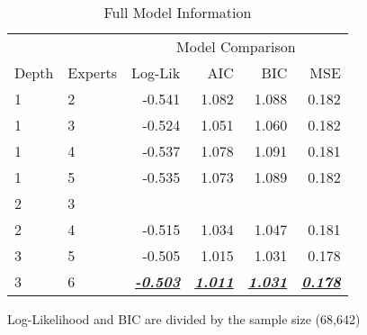 \documentclass[12pt]{article}
\newcommand{\ibu}[1]{\textbf{\underline{\textit{#1}}}}
\begin{document}
\begin{table} \centering
  \caption{Full Model Information}
  \begin{threeparttable}
    {\footnotesize
    \begin{tabular}[r]{l l r r r r}
  \cmidrule{1-6}
        &         &  \multicolumn{4}{c}{Model Comparison} \\ 
   \cmidrule(l){3-6}
Depth & Experts & Log-Lik & AIC    & BIC    & MSE   \\ 
  \cmidrule{1-6}

1    &    2    & -0.541  & 1.082  & 1.088  & 0.182 \\
1    &    3    & -0.524  & 1.051  & 1.060  & 0.182 \\
1    &    4    & -0.537  & 1.078  & 1.091  & 0.181 \\
1    &    5    & -0.535  & 1.073  & 1.089  & 0.182 \\
2    &    3    &   &   &   &  \\
2    &    4    & -0.515  & 1.034  & 1.047  & 0.181 \\
3    &    5    & -0.505  & 1.015  & 1.031  & 0.178 \\
3    &    6    & \ibu{-0.503}  & \ibu{1.011}  & \ibu{1.031}  & \ibu{0.178} \\
        \cmidrule(l){1-6}
    \end{tabular}
    }
    \begin{tablenotes}
      \item{\footnotesize Log-Likelihood and BIC are divided by the sample size (68,642)}
    \end{tablenotes} \label{tbl:HME_spec_full}
  \end{threeparttable}
\end{table}
\end{document}
